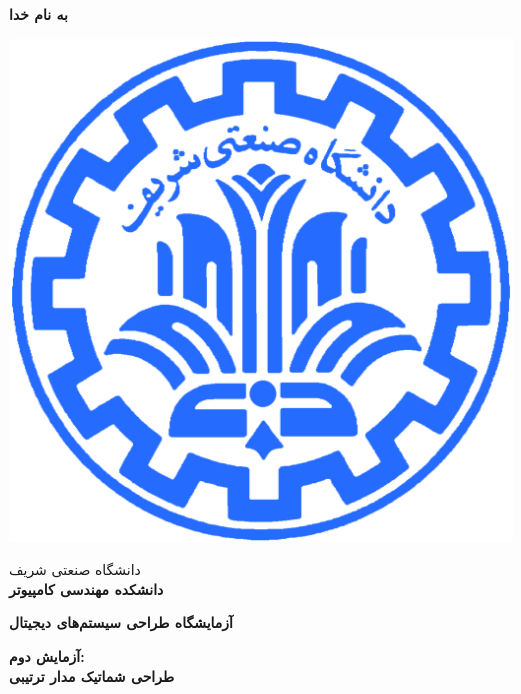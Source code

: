 \documentclass[12pt,onecolumn,a4paper,fleqn]{article}
\begin{document}
	\large
	\begin{titlepage}
		
		\begin{center}
			\begin{huge}
				\textbf{
					به نام خدا\\
				}
			\end{huge}
			
			\vspace*{1.5cm}
			\includegraphics[scale=0.9]{source/sharif_logo.png}\\
			\vspace*{0.5cm}
			\begin{Large}
				
					دانشگاه صنعتی شریف\\
					\vspace*{0.25cm}
				\textbf{
					دانشکده مهندسی کامپیوتر\\
				}
			\end{Large}
			\vspace*{3cm}
			\begin{huge}
				\textbf{
					آزمایشگاه طراحی سیستم‌های دیجیتال\\
					\vspace*{1.75cm}
				}
			\end{huge}
			
			\begin{Large}
				\textbf{
					آزمایش دوم:\\
					طراحی شماتیک مدار ترتیبی\\
				}
			\end{Large}
			

\end{center}
\end{titlepage}
\end{document}
